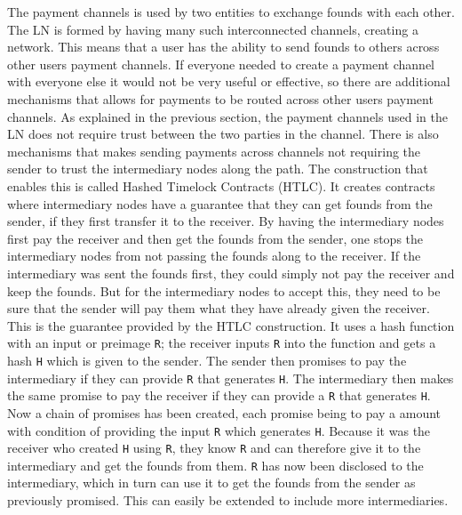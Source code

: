 The payment channels is used by two entities to exchange founds with each other. The LN is formed by having many such interconnected channels, creating a network. This means that a user has the ability to send founds to others across other users payment channels. If everyone needed to create a payment channel with everyone else it would not be very useful or effective, so there are additional mechanisms that allows for payments to be routed across other users payment channels.
As explained in the previous section, the payment channels used in the LN does not require trust between the two parties in the channel. There is also mechanisms that makes sending  payments across channels not requiring the sender to trust the intermediary nodes along the path. The construction that enables this is called Hashed Timelock Contracts (HTLC).
It creates contracts where intermediary nodes have a guarantee that they can get founds from the sender, if they first transfer it to the receiver. By having the intermediary nodes first pay the receiver and then get the founds from the sender, one stops the intermediary nodes from not passing the founds along to the receiver. If the intermediary was sent the founds first, they could simply not pay the receiver and keep the founds. But for the intermediary nodes to accept this, they need to be sure that the sender will pay them what they have already given the receiver. This is the guarantee provided by the HTLC construction.
It uses a hash function with an input or preimage {\tt R}; the receiver inputs {\tt R} into the function and gets a hash {\tt H} which is given to the sender. The sender then promises to pay the intermediary if they can provide {\tt R} that generates {\tt H}. The intermediary then makes the same promise to pay the receiver if they can provide a {\tt R} that generates {\tt H}. Now a chain of promises has been created, each promise being to pay a amount with condition of providing the input {\tt R} which generates {\tt H}. Because it was the receiver who created {\tt H} using {\tt R}, they know {\tt R} and can therefore give it to the intermediary and get the founds from them. {\tt R} has now been disclosed to the intermediary, which in turn can use it to get the founds from the sender as previously promised. This can easily be extended to include more intermediaries.
\\

